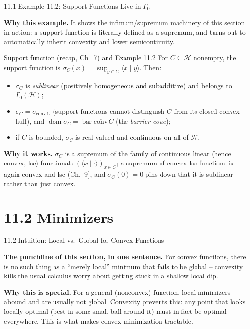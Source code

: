 \documentclass[aspectratio=169,10pt]{beamer}
\newcommand{\mHH}{\mathcal H}
\newcommand{\inner}[2]{\langle #1 \mid #2 \rangle}
\newcommand{\dom}{\operatorname{dom}}
\begin{document}
\begin{frame}{11.1 Example 11.2: Support Functions Live in $\Gamma_0$}

  \textbf{Why this example.} It shows the infimum/supremum machinery
  of this section in action: a support function is literally defined
  as a supremum, and turns out to automatically inherit convexity and
  lower semicontinuity.

  \begin{block}{Support function (recap, Ch.\ 7) and Example 11.2}
    For $C\subseteq\mHH$ nonempty, the support function is
    $\sigma_C(x)=\sup_{y\in C}\inner{x}{y}$. Then:
    \begin{itemize}
      \item $\sigma_C$ is \emph{sublinear} (positively homogeneous
            and subadditive) and belongs to $\Gamma_0(\mHH)$;
      \item $\sigma_C=\sigma_{\overline{\mathrm{conv}}\,C}$ (support
            functions cannot distinguish $C$ from its closed convex
            hull), and $\dom\sigma_C=\operatorname{bar}\overline{\mathrm{conv}}\,C$
            (the \emph{barrier cone});
      \item if $C$ is bounded, $\sigma_C$ is real-valued and
            continuous on all of $\mHH$.
    \end{itemize}
  \end{block}

  \textbf{Why it works.} $\sigma_C$ is a supremum of the family of
  continuous linear (hence convex, lsc) functionals
  $(\inner{x}{\cdot})_{x\in C}$; a supremum of convex lsc functions is
  again convex and lsc (Ch.\ 9), and $\sigma_C(0)=0$ pins down that it
  is sublinear rather than just convex.

\end{frame}

\section{11.2 Minimizers}

\begin{frame}{11.2 Intuition: Local vs.\ Global for Convex Functions}

  \textbf{The punchline of this section, in one sentence.} For convex
  functions, there is no such thing as a ``merely local'' minimum that
  fails to be global -- convexity kills the usual calculus worry about
  getting stuck in a shallow local dip.

  \textbf{Why this is special.} For a general (nonconvex) function,
  local minimizers abound and are usually not global. Convexity
  prevents this: any point that looks locally optimal (best in some
  small ball around it) must in fact be optimal everywhere. This is
  what makes convex minimization tractable.

\end{frame}
\end{document}

